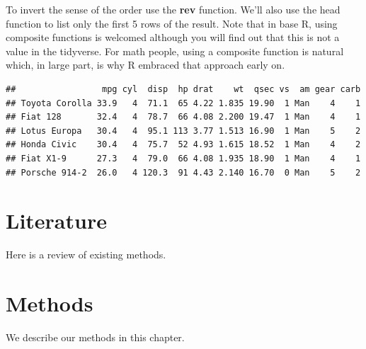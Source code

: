 \documentclass[]{book}
\newenvironment{Shaded}{\begin{snugshade}}{\end{snugshade}}
\newcommand{\KeywordTok}[1]{\textcolor[rgb]{0.13,0.29,0.53}{\textbf{#1}}}
\newcommand{\OperatorTok}[1]{\textcolor[rgb]{0.81,0.36,0.00}{\textbf{#1}}}
\newcommand{\NormalTok}[1]{#1}
\begin{document}
To invert the sense of the order use the \textbf{rev} function. We'll
also use the head function to list only the first 5 rows of the result.
Note that in base R, using composite functions is welcomed although you
will find out that this is not a value in the tidyverse. For math
people, using a composite function is natural which, in large part, is
why R embraced that approach early on.

\begin{Shaded}
\end{Shaded}

\begin{verbatim}
##                 mpg cyl  disp  hp drat    wt  qsec vs  am gear carb
## Toyota Corolla 33.9   4  71.1  65 4.22 1.835 19.90  1 Man    4    1
## Fiat 128       32.4   4  78.7  66 4.08 2.200 19.47  1 Man    4    1
## Lotus Europa   30.4   4  95.1 113 3.77 1.513 16.90  1 Man    5    2
## Honda Civic    30.4   4  75.7  52 4.93 1.615 18.52  1 Man    4    2
## Fiat X1-9      27.3   4  79.0  66 4.08 1.935 18.90  1 Man    4    1
## Porsche 914-2  26.0   4 120.3  91 4.43 2.140 16.70  0 Man    5    2
\end{verbatim}

\chapter{Literature}\label{literature}

Here is a review of existing methods.

\chapter{Methods}\label{methods}

We describe our methods in this chapter.


\end{document}
